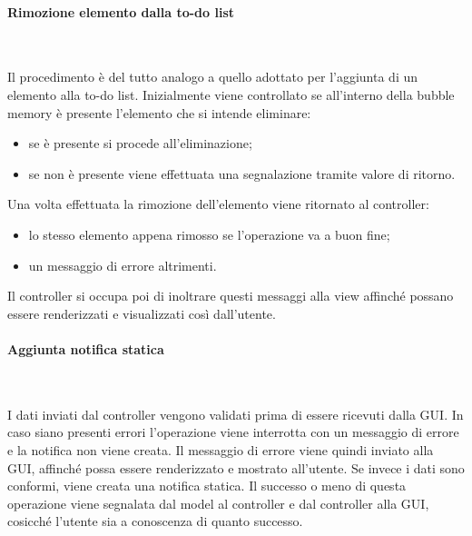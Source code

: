 \begin{samepage}
	\paragraph{Rimozione elemento dalla to-do list}\mbox{}\\
\end{samepage}
Il procedimento è del tutto analogo a quello adottato per l'aggiunta di un elemento alla to-do list. Inizialmente viene controllato se all'interno della bubble memory è presente l'elemento che si intende eliminare: 
\begin{itemize}
	\item se è presente si procede all'eliminazione;
	\item se non è presente viene effettuata una segnalazione tramite valore di ritorno.
\end{itemize}
Una volta effettuata la rimozione dell'elemento viene ritornato al controller:
\begin{itemize}
	\item lo stesso elemento appena rimosso se l’operazione va a buon fine;
	\item un messaggio di errore altrimenti.
\end{itemize}
Il controller si occupa poi di inoltrare questi messaggi alla view affinché possano essere renderizzati e visualizzati così dall'utente.

\begin{samepage}
	\paragraph{Aggiunta notifica statica}\mbox{}\\
\end{samepage}
I dati inviati dal controller vengono validati prima di essere ricevuti dalla GUI. In caso siano presenti errori l’operazione viene interrotta con un messaggio di errore e la notifica non viene creata. Il messaggio di errore viene quindi inviato alla GUI, affinché possa essere renderizzato e mostrato all’utente. Se invece i dati sono conformi, viene creata una notifica statica. Il successo o meno di questa operazione viene segnalata dal model al controller e dal controller alla GUI, cosicché l’utente sia a conoscenza di quanto successo.

